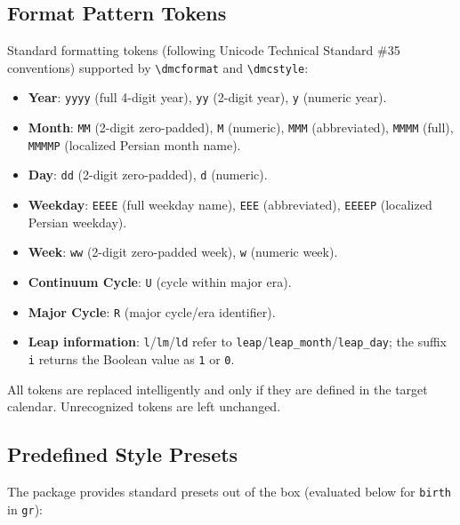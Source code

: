 \documentclass[10pt]{article}
\begin{document}
    \subsection{Format Pattern Tokens}
    
    Standard formatting tokens (following Unicode Technical Standard \#35 conventions) supported by \verb|\dmcformat| and \verb|\dmcstyle|:
    
    \begin{itemize}
        \item \textbf{Year}: \texttt{yyyy} (full 4-digit year), \texttt{yy} (2-digit year), \texttt{y} (numeric year).
        
        \item \textbf{Month}: \texttt{MM} (2-digit zero-padded), \texttt{M} (numeric), 
        \texttt{MMM} (abbreviated), \texttt{MMMM} (full), \texttt{MMMMP} (localized Persian month name).
        
        \item \textbf{Day}: \texttt{dd} (2-digit zero-padded), \texttt{d} (numeric).
        
        \item \textbf{Weekday}: \texttt{EEEE} (full weekday name), \texttt{EEE} (abbreviated),
        \texttt{EEEEP} (localized Persian weekday).
        
        \item \textbf{Week}: \texttt{ww} (2-digit zero-padded week), \texttt{w} (numeric week).
        
        \item \textbf{Continuum Cycle}: \texttt{U} (cycle within major era).
        
        \item \textbf{Major Cycle}: \texttt{R} (major cycle/era identifier).
        
         \item \textbf{Leap information}:
        \texttt{l}/\texttt{lm}/\texttt{ld} refer to
        \texttt{leap}/\texttt{leap\_month}/\texttt{leap\_day};
        the suffix \texttt{i} returns the Boolean value as \texttt{1} or
        \texttt{0}.
    \end{itemize}
    
    All tokens are replaced intelligently and only if they are defined in the target calendar. 
    Unrecognized tokens are left unchanged.
        \subsection{Predefined Style Presets}
    The package provides standard presets out of the box (evaluated below for \texttt{birth} in \texttt{gr}):
    
\end{document}
